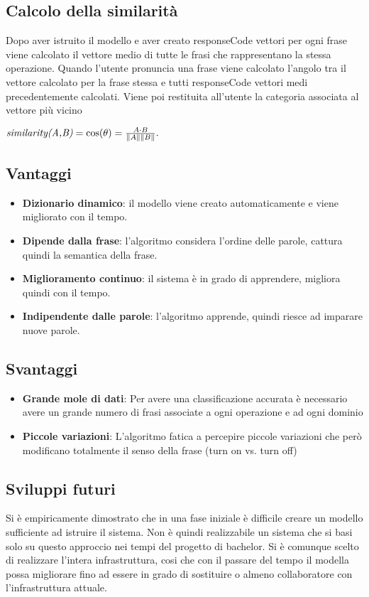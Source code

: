 \documentclass[twoside]{supsistudent}
\begin{document}
\subsection{Calcolo della similarità}
Dopo aver istruito il modello e aver creato responseCode vettori per ogni frase viene calcolato il vettore medio di tutte le frasi che rappresentano la stessa operazione. Quando l'utente pronuncia una frase viene calcolato l'angolo tra il vettore calcolato per la frase stessa e tutti responseCode vettori medi precedentemente calcolati. Viene poi restituita all'utente la categoria associata al vettore più vicino
\begin{center}
\begin{math}
 \textit{similarity(A,B)} = \cos(\theta) = {A \cdot B \over \|A\| \|B\|}.
 \end{math}
 \end{center}
\subsection{Vantaggi}
\begin{itemize}
  \item \textbf{Dizionario dinamico}: il modello viene creato automaticamente e viene migliorato con il tempo.
  \item \textbf{Dipende dalla frase}: l'algoritmo considera l'ordine delle parole, cattura quindi la semantica della frase.
  \item \textbf{Miglioramento continuo}: il sistema è in grado di apprendere, migliora quindi con il tempo.
  \item \textbf{Indipendente dalle parole}: l'algoritmo apprende, quindi riesce ad imparare nuove parole.
\end{itemize}
\subsection{Svantaggi}
\begin{itemize}
  \item \textbf{Grande mole di dati}: Per avere una classificazione accurata è necessario avere un grande numero di frasi associate a ogni operazione e ad ogni dominio
  \item \textbf{Piccole variazioni}: L'algoritmo fatica a percepire piccole variazioni che però modificano totalmente il senso della frase (turn on vs. turn off)
\end{itemize}
\subsection{Sviluppi futuri}
Si è empiricamente dimostrato che in una fase iniziale è difficile creare un modello sufficiente ad istruire il sistema. Non è quindi realizzabile un sistema che si basi solo su questo approccio nei tempi del progetto di bachelor. Si è comunque scelto di realizzare l'intera infrastruttura, cosi che con il passare del tempo il modella possa migliorare fino ad essere in grado di sostituire o almeno collaboratore con l'infrastruttura attuale.
\newpage
\end{document}
